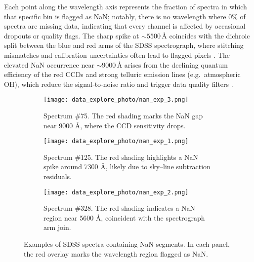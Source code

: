 \documentclass[english,bachelor,oneside]{ctufit-thesis}
\begin{document}
Each point along the wavelength axis represents the fraction of spectra in which that specific bin is flagged as NaN; notably, there is no wavelength where 0\% of spectra are missing data, indicating that every channel is affected by occasional dropouts or quality flags. The sharp spike at $\sim5500\,$Å coincides with the dichroic split between the blue and red arms of the SDSS spectrograph, where stitching mismatches and calibration uncertainties often lead to flagged pixels \cite{Gunn2006}. The elevated NaN occurrence near $\sim9000\,$Å arises from the declining quantum efficiency of the red CCDs and strong telluric emission lines (e.g.\ atmospheric OH), which reduce the signal‐to‐noise ratio and trigger data quality filters \cite{Smee2013}.

\begin{figure}[H]
  \centering
  \begin{subfigure}[b]{0.9\textwidth}
    \centering
    \texttt{[image: data\_explore\_photo/nan\_exp\_3.png]} %
    \caption{Spectrum \#75. The red shading marks the NaN gap near 9000 Å, where the CCD sensitivity drops.}
    \label{fig:spec75}
  \end{subfigure}
  \vspace{1em}

  \begin{subfigure}[b]{0.9\textwidth}
    \centering
    \texttt{[image: data\_explore\_photo/nan\_exp\_1.png]} %
    \caption{Spectrum \#125. The red shading highlights a NaN spike around 7300 Å, likely due to sky–line subtraction residuals.}
    \label{fig:spec125}
  \end{subfigure}
  \vspace{1em}

  \begin{subfigure}[b]{0.9\textwidth}
    \centering
    \texttt{[image: data\_explore\_photo/nan\_exp\_2.png]} %
    \caption{Spectrum \#328. The red shading indicates a NaN region near 5600 Å, coincident with the spectrograph arm join.}
    \label{fig:spec328}
  \end{subfigure}
  \caption{Examples of SDSS spectra containing NaN segments. In each panel, the red overlay marks the wavelength region flagged as NaN.}
  \label{fig:example_nans}
\end{figure}
\end{document}
